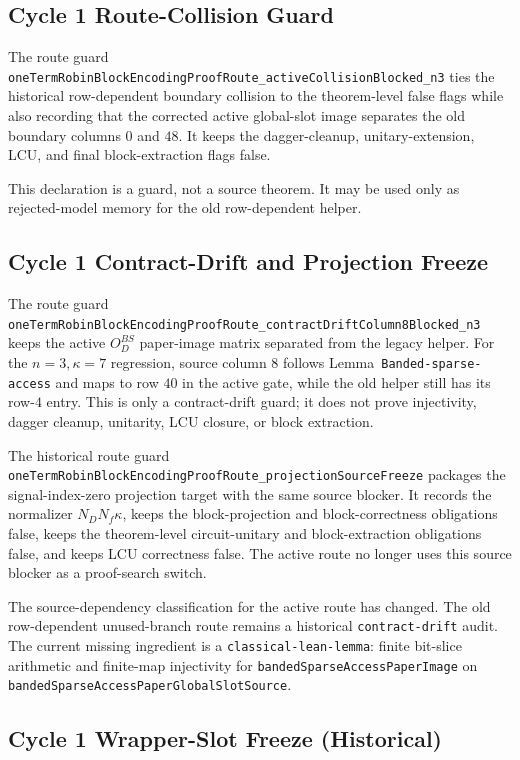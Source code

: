 \subsection{Cycle 1 Route-Collision Guard}

The route guard
\texttt{oneTermRobinBlockEncodingProofRoute\_activeCollisionBlocked\_n3}
ties the historical row-dependent boundary collision to the theorem-level
false flags while also recording that the corrected active global-slot image
separates the old boundary columns \(0\) and \(48\).  It keeps the
dagger-cleanup, unitary-extension, LCU, and final block-extraction flags false.

This declaration is a guard, not a source theorem.  It may be used only as
rejected-model memory for the old row-dependent helper.

\subsection{Cycle 1 Contract-Drift and Projection Freeze}

The route guard
\texttt{oneTermRobinBlockEncodingProofRoute\_contractDriftColumn8Blocked\_n3}
keeps the active \(O_D^{BS}\) paper-image matrix separated from the legacy
helper.  For the \(n=3,\kappa=7\) regression, source column \(8\) follows
Lemma~\texttt{Banded-sparse-access} and maps to row \(40\) in the active gate,
while the old helper still has its row-\(4\) entry.  This is only a
contract-drift guard; it does not prove injectivity, dagger cleanup, unitarity,
LCU closure, or block extraction.

The historical route guard
\texttt{oneTermRobinBlockEncodingProofRoute\_projectionSourceFreeze} packages
the signal-index-zero projection target with the same source blocker.  It
records the normalizer \(N_DN_f\kappa\), keeps the block-projection and
block-correctness obligations false, keeps the theorem-level circuit-unitary
and block-extraction obligations false, and keeps LCU correctness false.  The
active route no longer uses this source blocker as a proof-search switch.

The source-dependency classification for the active route has changed.  The
old row-dependent unused-branch route remains a historical
\texttt{contract-drift} audit.  The current missing ingredient is a
\texttt{classical-lean-lemma}: finite bit-slice arithmetic and finite-map
injectivity for \texttt{bandedSparseAccessPaperImage} on
\texttt{bandedSparseAccessPaperGlobalSlotSource}.

\subsection{Cycle 1 Wrapper-Slot Freeze (Historical)}

